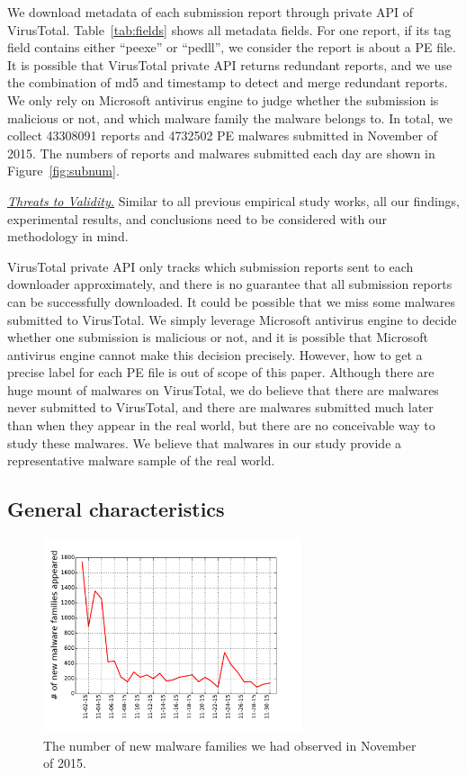We download metadata of each submission report through private API of VirusTotal.
Table~\ref{tab:fields} shows all metadata fields.
For one report, if its tag field contains either ``peexe'' or ``pedll'', 
we consider the report is about a PE file. 
It is possible that VirusTotal private API returns redundant reports, 
and we use the combination of md5 and timestamp to detect and merge redundant reports.
We only rely on Microsoft antivirus engine to judge whether the submission is malicious or not, 
and which malware family the malware belongs to. 
In total, we collect 43308091 reports and 4732502 PE malwares submitted
in November of 2015. 
The numbers of reports and malwares submitted each day are shown in Figure~\ref{fig:subnum}.


\textit{\underline{Threats to Validity.}}
Similar to all previous empirical study works, all our findings, experimental results, 
and conclusions need to be considered with our methodology in mind. 

VirusTotal private API only tracks which submission reports sent to each downloader approximately, 
and there is no guarantee that all submission reports can be successfully downloaded. 
It could be possible that we miss some malwares submitted to VirusTotal. 
We simply leverage Microsoft antivirus engine to decide whether one submission is malicious or not, 
and it is possible that Microsoft antivirus engine cannot make this decision precisely. 
However, how to get a precise label for each PE file is out of scope of this paper.  
Although there are huge mount of malwares on VirusTotal, we do believe that there are malwares never submitted to VirusTotal, 
and there are malwares submitted much later than when they appear in the real world, but there are no conceivable way to study these malwares. 
We believe that malwares in our study provide a representative malware sample of the real world. 

\subsection{General characteristics}

\begin{figure}[t!]
\begin{center}
\includegraphics[width=3.0in]{figure/new_family}
\caption{The number of new malware families we had observed in November of 2015.}
\label{fig:acum}
\end{center}
\end{figure}

